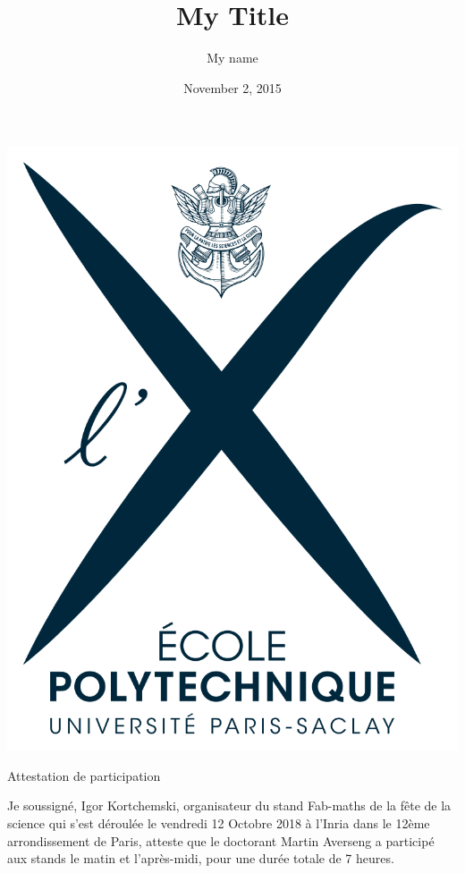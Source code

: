 \documentclass{article}
\title{My Title}
\author{My name}
\date{November 2, 2015}
\begin{document}
\includegraphics[scale = 0.1]{logoX}\hfill
\vspace{2cm}

\begin{center}
	\begin{Huge}
		Attestation de participation
	\end{Huge}
\end{center}
		 
		 \vspace{2cm}
	

Je soussigné, Igor Kortchemski, organisateur du stand Fab-maths de la fête de la science qui s'est déroulée le vendredi 12 Octobre 2018 à l'Inria dans le 12ème arrondissement de Paris, atteste que le doctorant Martin Averseng a participé aux stands le matin et l'après-midi, pour une durée totale de 7 heures. 
 
	
	
\end{document}
